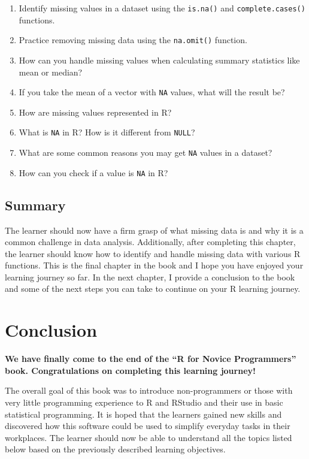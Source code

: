 \documentclass[
  letterpaper,
  DIV=11,
  numbers=noendperiod]{scrreprt}
\begin{document}
\begin{enumerate}
\def\labelenumi{\roman{enumi}.}
\item
  Identify missing values in a dataset using the \texttt{is.na()} and
  \texttt{complete.cases()} functions.
\item
  Practice removing missing data using the \texttt{na.omit()} function.
\item
  How can you handle missing values when calculating summary statistics
  like mean or median?
\item
  If you take the mean of a vector with \texttt{NA} values, what will
  the result be?
\item
  How are missing values represented in R?
\item
  What is \texttt{NA} in R? How is it different from \texttt{NULL}?
\item
  What are some common reasons you may get \texttt{NA} values in a
  dataset?
\item
  How can you check if a value is \texttt{NA} in R?
\end{enumerate}

\section{Summary}\label{summary-11}

The learner should now have a firm grasp of what missing data is and why
it is a common challenge in data analysis. Additionally, after
completing this chapter, the learner should know how to identify and
handle missing data with various R functions. This is the final chapter
in the book and I hope you have enjoyed your learning journey so far. In
the next chapter, I provide a conclusion to the book and some of the
next steps you can take to continue on your R learning journey.


\chapter*{Conclusion}\label{conclusion-1}


\textbf{We have finally come to the end of the ``R for Novice
Programmers'' book. Congratulations on completing this learning
journey!}

The overall goal of this book was to introduce non-programmers or those
with very little programming experience to R and RStudio and their use
in basic statistical programming. It is hoped that the learners gained
new skills and discovered how this software could be used to simplify
everyday tasks in their workplaces. The learner should now be able to
understand all the topics listed below based on the previously described
learning objectives.
\end{document}
